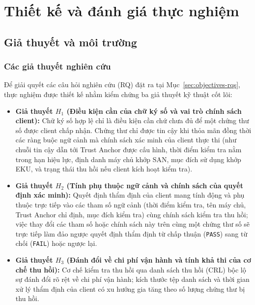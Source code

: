 \chapter{Thiết kế và đánh giá thực nghiệm}
\label{chap:experiment}

\section{Giả thuyết và môi trường}
\label{sec:exp-hypotheses-env}

\subsection{Các giả thuyết nghiên cứu}
\label{subsec:exp-hypotheses}
Để giải quyết các câu hỏi nghiên cứu (RQ) đặt ra tại Mục~\ref{sec:objectives-rqs}, thực nghiệm được thiết kế nhằm kiểm chứng ba giả thuyết kỹ thuật cốt lõi:
\begin{itemize}
    \item \textbf{Giả thuyết $H_1$ (Điều kiện cần của chữ ký số và vai trò chính sách client):} Chữ ký số hợp lệ chỉ là điều kiện cần chứ chưa đủ để một chứng thư số được client chấp nhận. Chứng thư chỉ được tin cậy khi thỏa mãn đồng thời các ràng buộc ngữ cảnh mà chính sách xác minh của client thực thi (như chuỗi tin cậy dẫn tới Trust Anchor được cấu hình, thời điểm kiểm tra nằm trong hạn hiệu lực, định danh máy chủ khớp SAN, mục đích sử dụng khớp EKU, và trạng thái thu hồi nếu client kích hoạt kiểm tra).
    \item \textbf{Giả thuyết $H_2$ (Tính phụ thuộc ngữ cảnh và chính sách của quyết định xác minh):} Quyết định thẩm định của client mang tính động và phụ thuộc trực tiếp vào các tham số ngữ cảnh (thời điểm kiểm tra, tên máy chủ, Trust Anchor chỉ định, mục đích kiểm tra) cùng chính sách kiểm tra thu hồi; việc thay đổi các tham số hoặc chính sách này trên cùng một chứng thư số sẽ trực tiếp làm đảo ngược quyết định thẩm định từ chấp thuận (\texttt{PASS}) sang từ chối (\texttt{FAIL}) hoặc ngược lại.
    \item \textbf{Giả thuyết $H_3$ (Đánh đổi về chi phí vận hành và tính khả thi của cơ chế thu hồi):} Cơ chế kiểm tra thu hồi qua danh sách thu hồi (CRL) bộc lộ sự đánh đổi rõ rệt về chi phí vận hành; kích thước tệp danh sách và thời gian xử lý thẩm định của client có xu hướng gia tăng theo số lượng chứng thư bị thu hồi.
\end{itemize}

